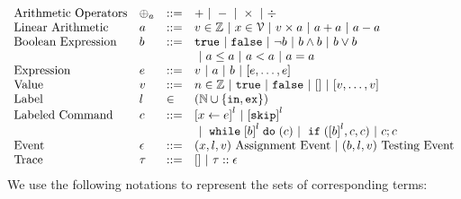 \[
\begin{array}{llll}
\mbox{Arithmetic Operators} 
& \oplus_a & ::= & + ~|~ - ~|~ \times 
%
~|~ \div
\\  
\mbox{Linear Arithmetic} 
& \aexpr & ::= & 
v \in \mathbb{Z} ~|~ x \in \vardom ~|~ v \times \aexpr ~|~ \aexpr + \aexpr ~|~ \aexpr - \aexpr
\\
\mbox{Boolean Expression} & \bexpr & ::= & 
%
\etrue ~|~ \efalse  ~|~ \neg \bexpr
 ~|~ \bexpr \land \bexpr
%
~|~ \bexpr \lor \bexpr 
\\
& & &
~|~ \aexpr \leq \aexpr 
~|~ \aexpr < \aexpr 
~|~ \aexpr = \aexpr 
\\
\mbox{Expression} & \expr & ::= & v ~|~ \aexpr ~|~ \bexpr ~|~ [\expr, \dots, \expr]
\\  
%
\mbox{Value} 
& v & ::= & { n \in \mathbb{Z} ~|~ \etrue ~|~ \efalse ~|~ [] ~|~ [v, \dots, v]} \\
%
\mbox{Label} 
& l & \in & (\mathbb{N} \cup \{\lin, \lex\}) 
\\ 
%
\mbox{Labeled Command} 
& {c} & ::= &  
\clabel{\assign{x}{\expr}}^l 
~|~  \clabel{\eskip}^l 
\\
& & &
~|~ \ewhile \clabel{\bexpr}^{l} \edo ({c})
~|~ \eif(\clabel{\bexpr}^{l} , {c}, {c}) 
~|~ {c};{c}  
\\ 
\mbox{Event} 
& \event & ::= & 
({x}, l, v) ~ \mbox{Assignment Event} 
~|~(\bexpr, l, v) ~ \mbox{Testing Event}
\\
\mbox{Trace} & \trace
& ::= & [] ~|~ \trace :: \event
\\
\end{array}
\]
We use the following notations to represent the sets of corresponding terms:
